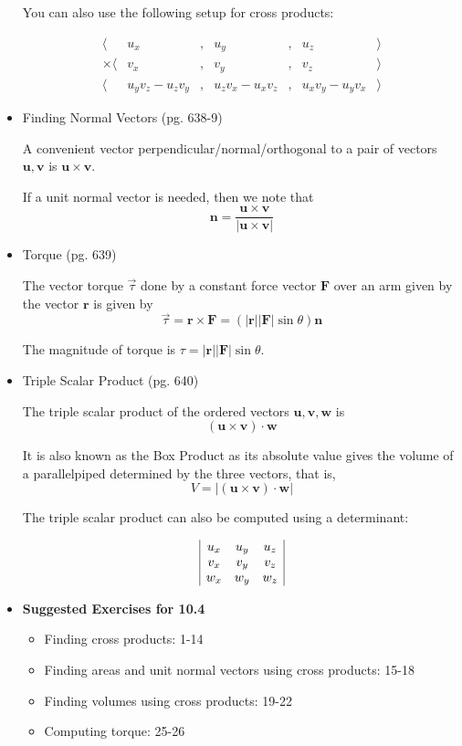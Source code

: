 \documentclass[12pt]{article}
\theoremstyle{plain}
\theoremstyle{definition}
\theoremstyle{remark}
\newcommand{\vect}[1]{\mathbf{#1}}
\begin{document}
\begin{itemize}
		You can also use the following setup for cross products:
		
		\[
\begin{array}{rcccccl}
\langle& u_x & , & u_y & , & u_z & \rangle \\
\times\langle & v_x & , & v_y & , & v_z & \rangle \\\hline
\langle & u_yv_z-u_zv_y & , & u_zv_x-u_xv_z & , & u_xv_y-u_yv_x & \rangle
\end{array}
		\]
		
		\item Finding Normal Vectors (pg. 638-9)
		
		A convenient vector perpendicular/normal/orthogonal to a pair of vectors $\vect{u},\vect{v}$ is $\vect{u} \times \vect{v}$.
		
		If a unit normal vector is needed, then we note that \[\vect{n} = \frac{\vect{u}\times\vect{v}}{|\vect{u}\times\vect{v}|} \]
		
		\item Torque (pg. 639)
		
		The vector torque $\overrightarrow{\tau}$ done by a constant force vector $\vect{F}$ over an arm given by the vector $\vect{r}$ is given by \[\overrightarrow{\tau} = \vect{r} \times \vect{F} = (|\vect{r}||\vect{F}|\sin \theta)\vect{n} \]
		
		The magnitude of torque is $\tau=|\vect{r}||\vect{F}|\sin\theta$.
		
		\item Triple Scalar Product (pg. 640)
		
		The triple scalar product of the ordered vectors $\vect{u},\vect{v},\vect{w}$ is \[(\vect{u}\times\vect{v})\cdot\vect{w}\]
		
		It is also known as the Box Product as its absolute value gives the volume of a parallelpiped determined by the three vectors, that is, \[V = |(\vect{u}\times\vect{v})\cdot\vect{w}|\]
		
		The triple scalar product can also be computed using a determinant:
		
		\[
\begin{array}{|c c c|}
u_x & u_y & u_z \\
v_x & v_y & v_z \\
w_x & w_y & w_z \\
\end{array}
		\]
		
		\item \textbf{Suggested Exercises for 10.4}
			\begin{itemize}
			\item Finding cross products: 1-14
			\item Finding areas and unit normal vectors using cross products: 15-18
			\item Finding volumes using cross products: 19-22
			\item Computing torque: 25-26
			\end{itemize}
		\end{itemize}
\end{document}
